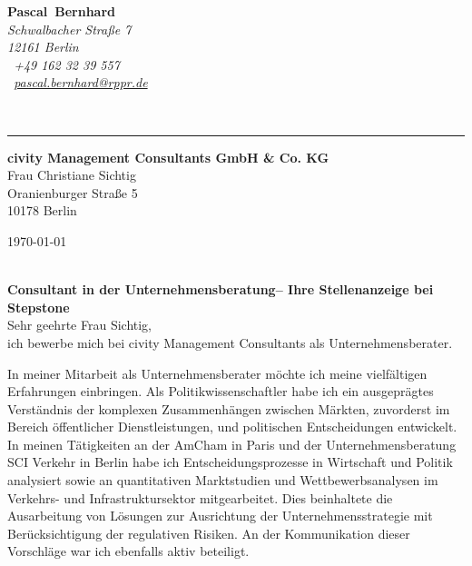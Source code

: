 \documentclass[11pt,a4paper]{article}
\def\firstname{Pascal}
\def\familyname{Bernhard}
\begin{document}
\sffamily   %
\hfill%
\begin{minipage}[t]{.6\textwidth}
	\raggedleft%
	{\bfseries {\color{firstnamecolor}\firstname}~{\color{familynamecolor}\familyname}}\\[.35ex]
	\small\itshape%
	Schwalbacher Straße 7\\
	12161 Berlin\\[.35ex]
	\Mobilefone~+49 162 32 39 557 \\
	\Letter~\href{mailto:pascal.bernhard@rppr.de}{pascal.bernhard@rppr.de}
\end{minipage}\\[0.5em]
%
{\color{firstnamecolor}\rule{\textwidth}{.25ex}}
%
\begin{minipage}[t]{.4\textwidth}
	\raggedright%
	\vspace*{1em}
	\textbf{civity Management Consultants GmbH \& Co. KG} \\
	Frau Christiane Sichtig \\[.35ex]
	\small%
	Oranienburger Straße 5\\
	10178 Berlin
\end{minipage}
%
\hfill
%
\begin{minipage}[t]{.4\textwidth}
	\raggedleft %
	\today
\end{minipage}\\[1em]


{\bfseries \color{familynamecolor}Consultant in der Unternehmensberatung-- Ihre Stellenanzeige bei Stepstone}\\[0.75em]

Sehr geehrte Frau Sichtig,\\[0.5em]
%
ich bewerbe mich bei civity Management Consultants als Unternehmensberater.

In meiner Mitarbeit als Unternehmensberater möchte ich meine vielfältigen Erfahrungen einbringen. Als Politikwissenschaftler habe ich ein ausgeprägtes Verständnis der komplexen Zusammenhängen zwischen Märkten, zuvorderst im Bereich öffentlicher Dienstleistungen, und politischen Entscheidungen entwickelt. In meinen Tätigkeiten an der AmCham in Paris und der Unternehmensberatung SCI Verkehr in Berlin habe ich Entscheidungsprozesse in Wirtschaft und Politik analysiert sowie an quantitativen Marktstudien und Wettbewerbsanalysen im Verkehrs- und Infrastruktursektor mitgearbeitet. Dies beinhaltete die Ausarbeitung von Lösungen zur Ausrichtung der Unternehmensstrategie mit Berücksichtigung der regulativen Risiken. An der Kommunikation dieser Vorschläge war ich ebenfalls aktiv beteiligt.
\end{document}
